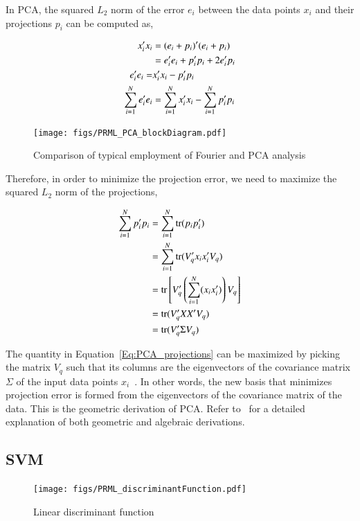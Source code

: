 In PCA, the squared $L_2$ norm of the error $e_i$ between the data points $x_i$ and their projections $p_i$ can be computed as,

\begin{align}
x_i'x_i 		&= 	(e_i + p_i)'(e_i + p_i) \notag\\
		&=	e_i'e_i + p_i'p_i + 2e_i'p_i\notag\\
e_i'e_i		=&	x_i'x_i - p_i'p_i\notag\\
\sum\limits_{i=1}^{N}e_i'e_i		&=	\sum\limits_{i=1}^{N}x_i'x_i - \sum\limits_{i=1}^{N}p_i'p_i
\end{align}

\begin{figure}[tp]
\centering
\texttt{[image: figs/PRML\_PCA\_blockDiagram.pdf]}
\caption{Comparison of typical employment of Fourier and PCA analysis}
\label{fig:PCA_Fourier_comparison}
\end{figure}

Therefore, in order to minimize the projection error, we need to maximize the squared $L_2$ norm of the projections,

\begin{align}
\sum\limits_{i=1}^{N} p_i'p_i 				&= \sum\limits_{i=1}^{N} \mbox{tr}(p_ip_i')\notag\\
				&= \sum\limits_{i=1}^{N} \mbox{tr}(V_q'x_ix_i'V_q)\notag\\
				&= \mbox{tr} \left[ V_q' \left(\sum\limits_{i=1}^{N} (x_ix_i')\right) V_q \right]\notag\\
				&= \mbox{tr} (V_q'XX'V_q)\notag\\
				&= \mbox{tr} (V_q'\Sigma V_q)
\label{Eq:PCA_projections}
\end{align}

The quantity in Equation~\ref{Eq:PCA_projections} can be maximized by picking the matrix $V_q$ such that its columns are the eigenvectors of the covariance matrix $\Sigma$ of the input data points $x_i$~\cite{2002_BOOK_PCA_Jolliffe}.  In other words, the new basis that minimizes projection error is formed from the eigenvectors of the covariance matrix of the data.  This is the geometric derivation of PCA.  Refer to~\cite{2002_BOOK_PCA_Jolliffe} for a detailed explanation of both geometric and algebraic derivations.

\subsection{SVM}
								\begin{figure}[tp]
									\center
									\texttt{[image: figs/PRML\_discriminantFunction.pdf]}
									\caption{Linear discriminant function}
									\label{PRML_discriminantFunction}
								\end{figure}

